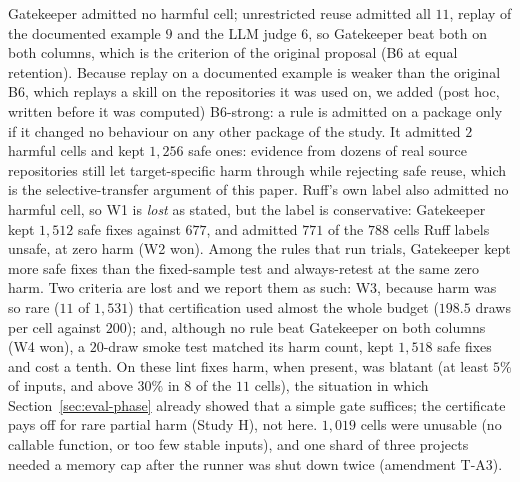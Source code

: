 Gatekeeper admitted no harmful cell; unrestricted reuse admitted all $11$, replay of the documented example $9$ and the LLM judge
$6$, so Gatekeeper beat both on both columns, which is the criterion of the original proposal (B6 at equal retention).  Because
replay on a documented example is weaker than the original B6, which replays a skill on the repositories it was used on, we added
(post hoc, written before it was computed) B6-strong: a rule is admitted on a package only if it changed no behaviour on any other
package of the study.  It admitted $2$ harmful cells and kept $1{,}256$ safe ones: evidence from dozens of real source repositories
still let target-specific harm through while rejecting safe reuse, which is the selective-transfer argument of this paper.  Ruff's own
label also admitted no harmful cell, so W1 is \emph{lost} as stated, but the label is conservative: Gatekeeper kept $1{,}512$ safe fixes
against $677$, and admitted $771$ of the $788$ cells Ruff labels unsafe, at zero harm (W2 won).  Among the rules that run
trials, Gatekeeper kept more safe fixes than the fixed-sample test and always-retest at the same zero harm.  Two criteria are
lost and we report them as such: W3, because harm was so rare ($11$ of $1{,}531$) that certification used almost the whole budget
($198.5$ draws per cell against $200$); and, although no rule beat Gatekeeper on both columns (W4 won), a $20$-draw smoke test matched
its harm count, kept $1{,}518$ safe fixes and cost a tenth.  On these lint fixes harm, when present, was blatant (at least $5\%$ of
inputs, and above $30\%$ in $8$ of the $11$ cells), the situation in which Section~\ref{sec:eval-phase} already showed that a simple
gate suffices; the certificate pays off for rare partial harm (Study H), not here.  $1{,}019$ cells were unusable (no callable
function, or too few stable inputs), and one shard of three projects needed a memory cap after the runner was shut down twice
(amendment T-A3).

